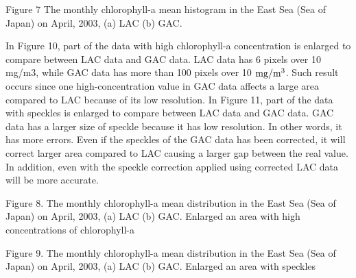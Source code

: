   
  Figure 7 The monthly chlorophyll-a mean histogram in the East Sea (Sea of Japan) on April, 2003, (a) LAC (b) GAC.
  
  
   In Figure 10, part of the data with high chlorophyll-a concentration is enlarged to compare between LAC data and GAC data. LAC data has 6 pixels over 10 mg/m3, while GAC data has more than 100 pixels over 10 $\rm mg/m^3$. Such result occurs since one high-concentration value in GAC data affects a large area compared to LAC because of its low resolution.
  In Figure 11, part of the data with speckles is enlarged to compare between LAC data and GAC data. GAC data has a larger size of speckle because it has low resolution. In other words, it has more errors. Even if the speckles of the GAC data has been corrected, it will correct larger area compared to LAC causing a larger gap between the real value. In addition, even with the speckle correction applied using corrected LAC data will be more accurate.
  
  Figure 8. The monthly chlorophyll-a mean distribution in the East Sea (Sea of Japan) on April, 2003, (a) LAC (b) GAC. Enlarged an area with high concentrations of chlorophyll-a
  
  Figure 9. The monthly chlorophyll-a mean distribution in the East Sea (Sea of Japan) on April, 2003, (a) LAC (b) GAC. Enlarged an area with speckles
  
  
  
  